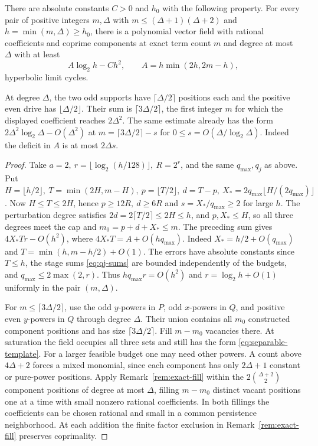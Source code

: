 \begin{theorem}\label{thm:joint-main}
There are absolute constants \(C>0\) and \(h_0\) with the following property. For every pair of positive integers \(m,\Delta\) with \(m\le(\Delta+1)(\Delta+2)\) and \(h=\min(m,\Delta)\ge h_0\), there is a polynomial vector field with rational coefficients and coprime components at exact term count \(m\) and degree at most \(\Delta\) with at least
\[
 A\log_2 h-C h^2,\qquad A=h\min(2h,2m-h),
\]
hyperbolic limit cycles.
\end{theorem}
At degree \(\Delta\), the two odd supports have \(\lceil\Delta/2\rceil\) positions each and the positive even drive has \(\lfloor\Delta/2\rfloor\). Their sum is \(\lceil3\Delta/2\rceil\), the first integer \(m\) for which the displayed coefficient reaches \(2\Delta^2\).
The same estimate already has the form \(2\Delta^2\log_2\Delta-O(\Delta^2)\) at \(m=\lceil3\Delta/2\rceil-s\) for \(0\le s=O(\Delta/\log_2\Delta)\). Indeed the deficit in \(A\) is at most \(2\Delta s\).
\begin{proof}
Take \(a=2,\ r=\lfloor\log_2(h/128)\rfloor,\ R=2^r\), and the same \(q_{\max},q_j\) as above. Put \(H=\lfloor h/2\rfloor,\ T=\min(2H,m-H),\ p=\lfloor T/2\rfloor,\ d=T-p,\ X_*=2q_{\max}\lfloor H/(2q_{\max})\rfloor\). Now \(H\le T\le2H\), hence \(p\ge12R,\ d\ge6R\) and \(s=X_*/q_{\max}\ge2\) for large \(h\). The perturbation degree satisfies \(2d=2\lceil T/2\rceil\le2H\le h\), and \(p,X_*\le H\), so all three degrees meet the cap and \(m_0=p+d+X_*\le m\). The preceding sum gives \(4X_*Tr-O(h^2)\), where \(4X_*T=A+O(hq_{\max})\). Indeed \(X_*=h/2+O(q_{\max})\) and \(T=\min(h,m-h/2)+O(1)\). The errors have absolute constants since \(T\le h\), the stage sums \eqref{eq:qj-sums} are bounded independently of the budgets, and \(q_{\max}\le 2\max(2,r)\). Thus \(hq_{\max}r=O(h^2)\) and \(r=\log_2 h+O(1)\) uniformly in the pair \((m,\Delta)\).

For \(m\le\lceil3\Delta/2\rceil\), use the odd \(y\)-powers in \(P\), odd \(x\)-powers in \(Q\), and positive even \(y\)-powers in \(Q\) through degree \(\Delta\). Their union contains all \(m_0\) constructed component positions and has size \(\lceil3\Delta/2\rceil\). Fill \(m-m_0\) vacancies there. At saturation the field occupies all three sets and still has the form \eqref{eq:separable-template}. For a larger feasible budget one may need other powers. A count above \(4\Delta+2\) forces a mixed monomial, since each component has only \(2\Delta+1\) constant or pure-power positions. Apply Remark~\ref{rem:exact-fill} within the \(2\binom{\Delta+2}{2}\) component positions of degree at most \(\Delta\), filling \(m-m_0\) distinct vacant positions one at a time with small nonzero rational coefficients. In both fillings the coefficients can be chosen rational and small in a common persistence neighborhood. At each addition the finite factor exclusion in Remark~\ref{rem:exact-fill} preserves coprimality.
\end{proof}


